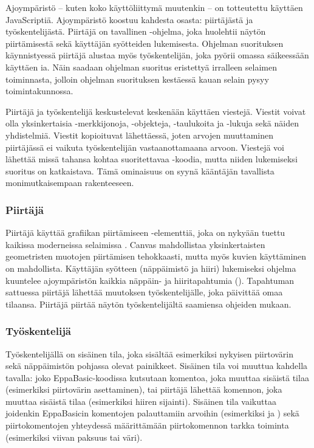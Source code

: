 Ajoympäristö -- kuten koko käyttöliittymä muutenkin --
on totteutettu käyttäen JavaScriptiä.
Ajoympäristö koostuu kahdesta osasta:
piirtäjästä ja työskentelijästä.
Piirtäjä on tavallinen -ohjelma,
joka huolehtii näytön piirtämisestä sekä käyttäjän syötteiden lukemisesta.
Ohjelman suorituksen käynnistyessä piirtäjä alustaa myös työskentelijän,
joka pyörii omassa säikeessään käyttäen ia.
Näin saadaan ohjelman suoritus eristettyä irralleen selaimen toiminnasta,
jolloin ohjelman suorituksen kestäessä kauan selain pysyy toimintakunnossa.

Piirtäjä ja työskentelijä keskustelevat keskenään käyttäen viestejä.
Viestit voivat olla yksinkertaisia -merkkijonoja,
-objekteja, -taulukoita ja -lukuja sekä näiden yhdistelmiä.
Viestit kopioituvat lähettäessä, joten arvojen muuttaminen
piirtäjässä ei vaikuta työskentelijän vastaanottamaana arvoon.
Viestejä voi lähettää missä tahansa kohtaa suoritettavaa
-koodia, mutta niiden lukemiseksi
suoritus on katkaistava.
Tämä ominaisuus on syynä kääntäjän tavallista monimutkaisempaan rakenteeseen.

\subsubsection{Piirtäjä}
Piirtäjä käyttää grafiikan piirtämiseen  -elementtiä,
joka on nykyään tuettu kaikissa moderneissa selaimissa
\cite{caniuse_canvas}.
Canvas mahdollistaa yksinkertaisten geometristen muotojen piirtämisen tehokkaasti,
mutta myös kuvien käyttäminen on mahdollista.
Käyttäjän syötteen (näppäimistö ja hiiri) lukemiseksi
ohjelma kuuntelee ajoympäristön kaikkia näppäin- ja hiiritapahtumia ().
Tapahtuman sattuessa piirtäjä lähettää muutoksen työskentelijälle,
joka päivittää omaa tilaansa.
Piirtäjä piirtää näytön työskentelijältä saamiensa ohjeiden mukaan.

\subsubsection{Työskentelijä}
Työskentelijällä on sisäinen tila,
joka sisältää esimerkiksi nykyisen piirtovärin
sekä näppäimistön pohjassa olevat painikkeet.
Sisäinen tila voi muuttua kahdella tavalla:
joko EppaBasic-koodissa kutsutaan komentoa,
joka muuttaa sisäistä tilaa (esimerkiksi piirtovärin asettaminen),
tai piirtäjä lähettää komennon,
joka muuttaa sisäistä tilaa (esimerkiksi hiiren sijainti).
Sisäinen tila vaikuttaa joidenkin EppaBasicin komentojen palauttamiin arvoihin
(esimerkiksi  ja )
sekä piirtokomentojen yhteydessä määrittämään
piirtokomennon tarkka toiminta (esimerkiksi viivan paksuus tai väri).

